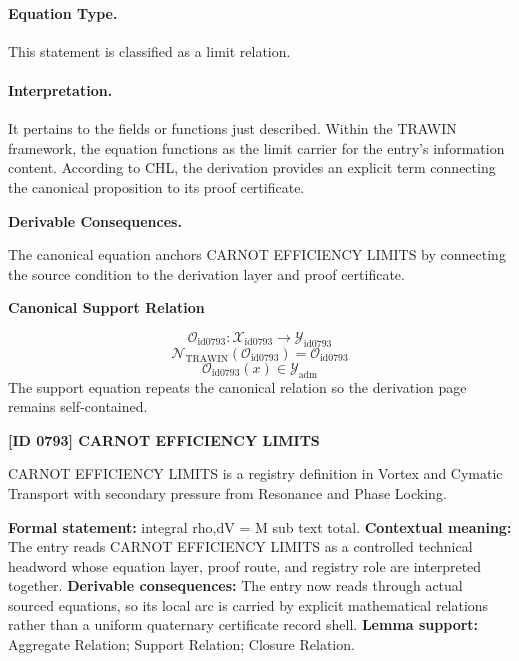 \paragraph{Equation Type.}
This statement is classified as a limit relation.

\paragraph{Interpretation.}
It pertains to the fields or functions just described. Within the TRAWIN framework, the equation functions as the limit carrier for the entry’s information content. According to CHL, the derivation provides an explicit term connecting the canonical proposition to its proof certificate.

\par\vspace{0.35em}
\noindent\textbf{Derivable Consequences.}\quad
\begingroup
\footnotesize
\raggedright
The canonical equation anchors CARNOT EFFICIENCY LIMITS by connecting the source condition to the derivation layer and proof certificate.
\par\endgroup

\noindent\textbf{Canonical Support Relation}\par
\[
\mathcal{O}_{\mathrm{id0793}}:\mathcal{X}_{\mathrm{id0793}}\longrightarrow\mathcal{Y}_{\mathrm{id0793}}
\]
\[
\mathcal{N}_{\mathrm{TRAWIN}}(\mathcal{O}_{\mathrm{id0793}})=\mathcal{O}_{\mathrm{id0793}}
\]
\[
\mathcal{O}_{\mathrm{id0793}}(x)\in\mathcal{Y}_{\mathrm{adm}}
\]
\noindent The support equation repeats the canonical relation so the derivation page remains self-contained.\par

\clearpage
\noindent\textbf{[ID 0793] CARNOT EFFICIENCY LIMITS}\par
\vspace{0.35em}
\begingroup\small
{}
CARNOT EFFICIENCY LIMITS is a registry definition in Vortex and Cymatic Transport with secondary pressure from Resonance and Phase Locking.

\begingroup\footnotesize\setlength{\emergencystretch}{3em}\sloppy
\textbf{Formal statement:} integral rho,dV = M sub text total. \textbf{Contextual meaning:} The entry reads CARNOT EFFICIENCY LIMITS as a controlled technical headword whose equation layer, proof route, and registry role are interpreted together. \textbf{Derivable consequences:} The entry now reads through actual sourced equations, so its local arc is carried by explicit mathematical relations rather than a uniform quaternary certificate record shell. \textbf{Lemma support:} Aggregate Relation; Support Relation; Closure Relation.\par
\endgroup

